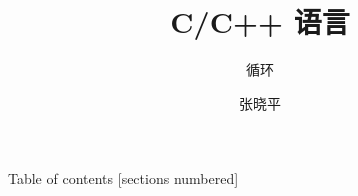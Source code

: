 \documentclass[10pt]{beamer}
\title{C/C++ 语言}
\subtitle{循环}
\date{}%
\author{张晓平}
\institute{武汉大学数学与统计学院}
\newcommand\Fontvi{\fontsize{6.5}{7.2}\selectfont}
\begin{document}
\maketitle

\begin{frame}{Table of contents}
  [sections numbered]
  \tableofcontents[hideallsubsections]
\end{frame}














\end{document}
